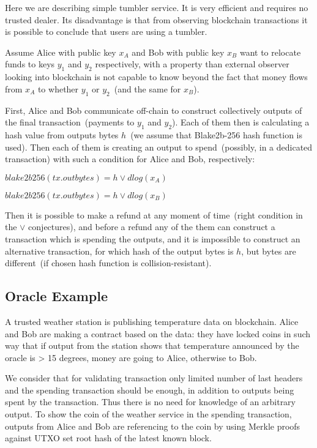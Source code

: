 \documentclass[11pt]{article}
\newcommand{\authnote}[2]{\marginpar{\parbox{\marginparwidth}{\tiny %
  \textsf{#1 {\textcolor{blue}{notes: #2}}}}}%
  \textcolor{blue}{\textbf{\dag}}}
\newcommand{\authnote}[2]{
  \textsf{#1 \textcolor{blue}{: #2}}}
\newcommand{\authnote}[2]{}
\newcommand{\knote}[1]{{\authnote{\textcolor{green}{kushti notes}}{#1}}}
\begin{document}
Here we are describing simple tumbler service. It is very efficient and requires no trusted dealer. Its disadvantage is that from observing blockchain transactions it is possible to conclude that users are using a tumbler.

Assume Alice with public key $x_A$ and Bob with public key $x_B$ want to relocate funds to keys $y_1$ and $y_2$ respectively, with a property than external observer looking into blockchain is not capable to know beyond the fact that money flows from $x_A$ to whether $y_1$ or $y_2$~(and the same for $x_B$).

First, Alice and Bob communicate off-chain to construct collectively outputs of the final transaction~(payments to $y_1$ and $y_2$). Each of them then is calculating a hash value from outputs bytes $h$~(we assume that Blake2b-256 hash function is used). Then each of them is creating an output to spend~(possibly, in a dedicated transaction) with such a condition for Alice and Bob, respectively:

$blake2b256(tx.outbytes) = h \lor dlog(x_A)$ 

$blake2b256(tx.outbytes) = h \lor dlog(x_B)$

Then it is possible to make a refund at any moment of time~(right condition in the $\lor$ conjectures), and before a refund any of the them can construct a transaction which is spending the outputs, and it is impossible to construct an alternative transaction, for which hash of the output bytes is $h$, but bytes are different~(if chosen hash function is collision-resistant).

\subsection{Oracle Example}

\knote{Text below is just copied from code comments, polish it}

A trusted weather station is publishing temperature data on blockchain. Alice and Bob are making a contract based on the data:
they have locked coins in such way that if output from the station shows that temperature announced by the oracle is > 15 degrees, money are going to Alice, otherwise to Bob.
    
We consider that for validating transaction only limited number of last headers and the spending transaction should be enough, in addition to outputs being spent by the transaction. Thus there is no need for knowledge of an arbitrary output. To show the coin of the weather service in the spending transaction, outputs from Alice and Bob are referencing to the coin by using Merkle proofs against UTXO set root hash of the latest known block.
    
\end{document}
